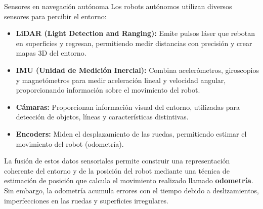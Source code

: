 \documentclass[10pt]{beamer}
\begin{document}
        \begin{frame}{Sensores en navegación autónoma}
            Los robots autónomos utilizan diversos sensores para percibir el entorno:
            \begin{itemize}
            \item \textbf{LiDAR (Light Detection and Ranging):} Emite pulsos láser que rebotan en superficies y regresan, permitiendo medir distancias con precisión y crear mapas 3D del entorno.
            \item \textbf{IMU (Unidad de Medición Inercial):} Combina acelerómetros, giroscopios y magnetómetros para medir aceleración lineal y velocidad angular, proporcionando información sobre el movimiento del robot.
            \item \textbf{Cámaras:} Proporcionan información visual del entorno, utilizadas para detección de objetos, líneas y características distintivas.
            \item \textbf{Encoders:} Miden el desplazamiento de las ruedas, permitiendo estimar el movimiento del robot (odometría).
            \end{itemize}
            La fusión de estos datos sensoriales permite construir una representación coherente del entorno y de la posición del robot mediante una técnica de estimación de posición 
            que calcula el movimiento realizado llamado \textbf{odometría}.\\
            Sin embargo, la odometría acumula errores con el tiempo debido a deslizamientos, imperfecciones en las ruedas y superficies irregulares.
            \end{frame}
\end{document}
